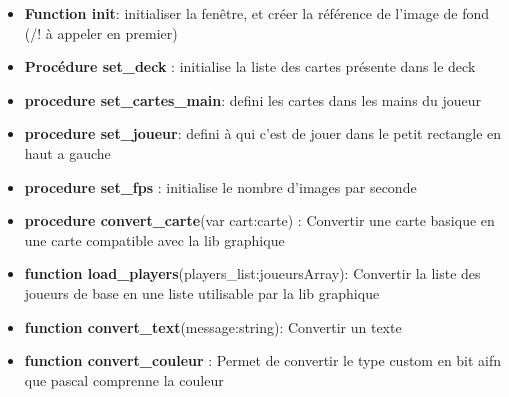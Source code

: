 \documentclass[12pt]{report}
\begin{document}
  \begin{itemize}
  \item \textbf{Function init}: initialiser la fenêtre, et créer la référence de l'image de fond (/! à appeler en premier)
  \item \textbf{Procédure set\_deck} : initialise la liste des cartes présente dans le deck
  \item \textbf{procedure set\_cartes\_main}: defini les cartes dans les mains du joueur
  \item \textbf{procedure set\_joueur}: defini à qui c'est de jouer dans le petit rectangle en haut a gauche 
  \item \textbf{procedure set\_fps} : initialise le nombre d'images par seconde 
\item \textbf{procedure convert\_carte}(var cart:carte) : Convertir une carte basique en une carte compatible avec la lib graphique
\item \textbf{function load\_players}(players\_list:joueursArray): Convertir la liste des joueurs de base en une liste utilisable par la lib graphique
\item \textbf{function convert\_text}(message:string): Convertir un texte
\item \textbf{function convert\_couleur} : Permet de convertir le type custom en bit aifn que pascal comprenne la couleur


\end{itemize}
\end{document}
